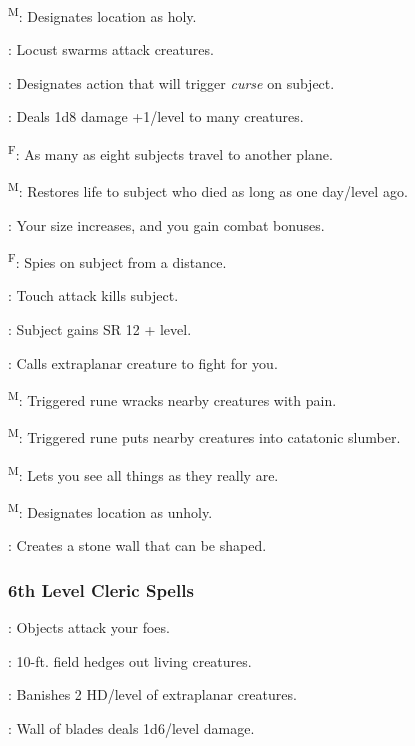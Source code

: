 \textsuperscript{M}: Designates location as holy.

: Locust swarms attack creatures.

: Designates action that will trigger \textit{curse} on subject.

: Deals 1d8 damage +1/level to many creatures.

\textsuperscript{F}: As many as eight subjects travel to another plane.

\textsuperscript{M}: Restores life to subject who died as long as one day/level ago.

: Your size increases, and you gain combat bonuses.

\textsuperscript{F}: Spies on subject from a distance.

: Touch attack kills subject.

: Subject gains SR 12 + level.

: Calls extraplanar creature to fight for you.

\textsuperscript{M}: Triggered rune wracks nearby creatures with pain.

\textsuperscript{M}: Triggered rune puts nearby creatures into catatonic slumber.

\textsuperscript{M}: Lets you see all things as they really are.

\textsuperscript{M}: Designates location as unholy.

: Creates a stone wall that can be shaped.

\subsubsection{6th Level Cleric Spells}

: Objects attack your foes.

: 10-ft. field hedges out living creatures.

: Banishes 2 HD/level of extraplanar creatures.

: Wall of blades deals 1d6/level damage.

